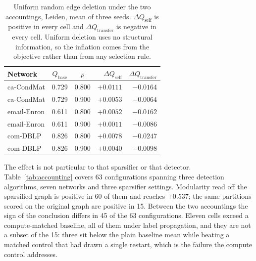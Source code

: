 \begin{table}[t]
\centering
\caption{Uniform random edge deletion under the two accountings, Leiden, mean of
three seeds. $\Delta Q_{\mathrm{self}}$ is positive in every cell and
$\Delta Q_{\mathrm{transfer}}$ is negative in every cell. Uniform deletion uses
no structural information, so the inflation comes from the objective rather than
from any selection rule.}
\label{tab:uniform}
\small
\setlength{\tabcolsep}{4pt}
\begin{tabular}{@{}lccrr@{}}
\toprule
Network & $Q_{\mathrm{base}}$ & $\rho$ & $\Delta Q_{\mathrm{self}}$ &
$\Delta Q_{\mathrm{transfer}}$\\
\midrule
ca-CondMat  & 0.729 & 0.800 & $+0.0111$ & $-0.0164$\\
ca-CondMat  & 0.729 & 0.900 & $+0.0053$ & $-0.0064$\\
email-Enron & 0.611 & 0.800 & $+0.0052$ & $-0.0162$\\
email-Enron & 0.611 & 0.900 & $+0.0011$ & $-0.0086$\\
com-DBLP    & 0.826 & 0.800 & $+0.0078$ & $-0.0247$\\
com-DBLP    & 0.826 & 0.900 & $+0.0040$ & $-0.0098$\\
\bottomrule
\end{tabular}
\end{table}

The effect is not particular to that sparsifier or that detector.
Table~\ref{tab:accounting} covers 63 configurations spanning three detection
algorithms, seven networks and three sparsifier settings. Modularity read off the
sparsified graph is positive in 60 of them and reaches $+0.537$; the same
partitions scored on the original graph are positive in 15. Between the two
accountings the sign of the conclusion differs in 45 of the 63 configurations.
Eleven cells exceed a compute-matched baseline, all of them under label
propagation, and they are not a subset of the 15: three sit below the plain
baseline mean while beating a matched control that had drawn a single restart,
which is the failure the compute control addresses.

